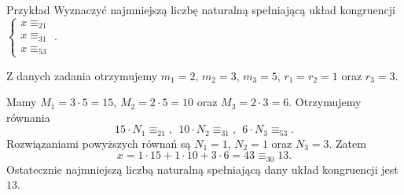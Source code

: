 \documentclass[a4paper,10pt]{beamer}
\begin{document}
\begin{frame}
	
	\begin{exampleblock}{Przykład}
		Wyznaczyć najmniejszą liczbę naturalną spełniającą układ kongruencji $\displaystyle\left\{\begin{array}{l}x\equiv_21\\x\equiv_31\\x\equiv_53\end{array}\right.$.
		
		Z danych zadania otrzymujemy $m_1=2$, $m_2=3$, $m_3=5$, $r_1=r_2=1$ oraz $r_3=3
		$.
		
		Mamy $M_1=3\cdot5=15$, $M_2=2\cdot5=10$ oraz $M_3=2\cdot3=6$. Otrzymujemy równania
		$$15\cdot N_1\equiv_21,\ \ 10\cdot N_2\equiv_31,\ \ 6\cdot N_3\equiv_53.$$
		Rozwiązaniami powyższych równań są $N_1=1$, $N_2=1$ oraz $N_3=3$. Zatem
		$$x=1\cdot15+1\cdot10+3\cdot6=43\equiv_{30}13.$$
		Ostatecznie najmniejszą liczbą naturalną spełniającą dany układ kongruencji jest $13$.
	\end{exampleblock}
	
\end{frame}
\end{document}
